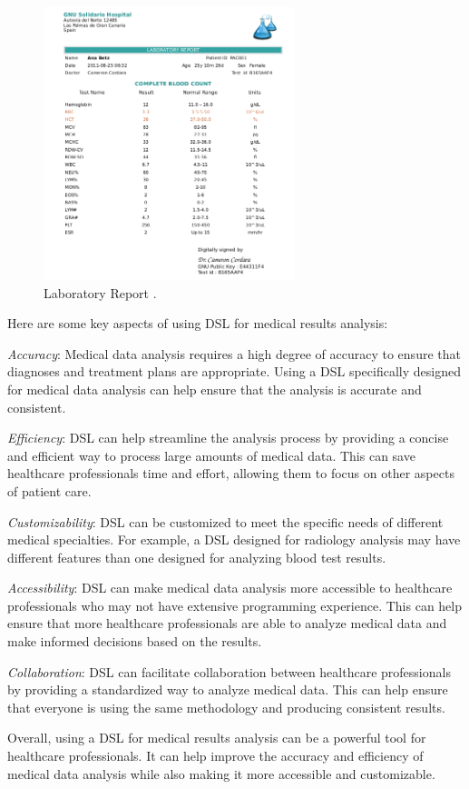 \vspace{0.5cm}
\begin{figure}[H]
  \centering
  \includegraphics[width=0.65\textwidth]{images/result.png}
  \caption{Laboratory Report \cite{report}.}
  \label{fig:medical_result}
\end{figure}


Here are some key aspects of using DSL for medical results analysis:

\emph{Accuracy}: Medical data analysis requires a high degree of accuracy to ensure that diagnoses and treatment plans are appropriate. Using a DSL specifically designed for medical data analysis can help ensure that the analysis is accurate and consistent.

\emph{Efficiency}: DSL can help streamline the analysis process by providing a concise and efficient way to process large amounts of medical data. This can save healthcare professionals time and effort, allowing them to focus on other aspects of patient care.

\emph{Customizability}: DSL can be customized to meet the specific needs of different medical specialties. For example, a DSL designed for radiology analysis may have different features than one designed for analyzing blood test results.

\emph{Accessibility}: DSL can make medical data analysis more accessible to healthcare professionals who may not have extensive programming experience. This can help ensure that more healthcare professionals are able to analyze medical data and make informed decisions based on the results.

\emph{Collaboration}: DSL can facilitate collaboration between healthcare professionals by providing a standardized way to analyze medical data. This can help ensure that everyone is using the same methodology and producing consistent results. \par
Overall, using a DSL for medical results analysis can be a powerful tool for healthcare professionals. It can help improve the accuracy and efficiency of medical data analysis while also making it more accessible and customizable.

